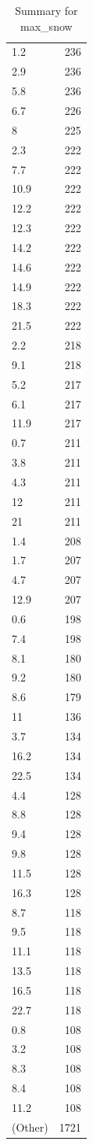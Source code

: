 \begin{table}[ht]
\begin{tabular}{lr}
  1.2 & 236 \\ 
  2.9 & 236 \\ 
  5.8 & 236 \\ 
  6.7 & 226 \\ 
  8 & 225 \\ 
  2.3 & 222 \\ 
  7.7 & 222 \\ 
  10.9 & 222 \\ 
  12.2 & 222 \\ 
  12.3 & 222 \\ 
  14.2 & 222 \\ 
  14.6 & 222 \\ 
  14.9 & 222 \\ 
  18.3 & 222 \\ 
  21.5 & 222 \\ 
  2.2 & 218 \\ 
  9.1 & 218 \\ 
  5.2 & 217 \\ 
  6.1 & 217 \\ 
  11.9 & 217 \\ 
  0.7 & 211 \\ 
  3.8 & 211 \\ 
  4.3 & 211 \\ 
  12 & 211 \\ 
  21 & 211 \\ 
  1.4 & 208 \\ 
  1.7 & 207 \\ 
  4.7 & 207 \\ 
  12.9 & 207 \\ 
  0.6 & 198 \\ 
  7.4 & 198 \\ 
  8.1 & 180 \\ 
  9.2 & 180 \\ 
  8.6 & 179 \\ 
  11 & 136 \\ 
  3.7 & 134 \\ 
  16.2 & 134 \\ 
  22.5 & 134 \\ 
  4.4 & 128 \\ 
  8.8 & 128 \\ 
  9.4 & 128 \\ 
  9.8 & 128 \\ 
  11.5 & 128 \\ 
  16.3 & 128 \\ 
  8.7 & 118 \\ 
  9.5 & 118 \\ 
  11.1 & 118 \\ 
  13.5 & 118 \\ 
  16.5 & 118 \\ 
  22.7 & 118 \\ 
  0.8 & 108 \\ 
  3.2 & 108 \\ 
  8.3 & 108 \\ 
  8.4 & 108 \\ 
  11.2 & 108 \\ 
  (Other) & 1721 \\ 
   \hline
\end{tabular}
\caption{Summary for max_snow} 
\label{tab: max_snow}
\end{table}
